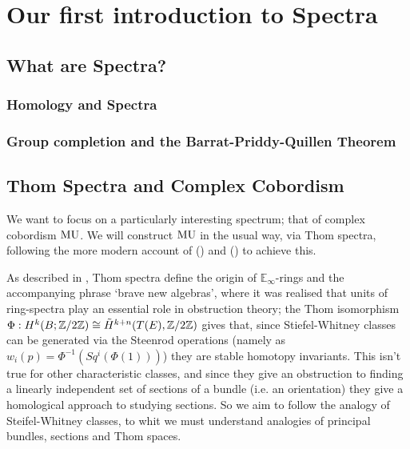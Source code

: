 \newpage
\section{Our first introduction to Spectra}

\subsection{What are Spectra?}
\subsubsection{Homology and Spectra}
\subsubsection{Group completion and the Barrat-Priddy-Quillen Theorem}



\newpage
\subsection{Thom Spectra and Complex Cobordism}
We want to focus on a particularly interesting spectrum; that of complex cobordism $\text{MU}$. We will construct $\text{MU}$ in the usual way, via Thom spectra, following the more modern account of (\cite{Ando2008}) and (\cite{Ando2013}) to achieve this.

As described in \cite{Ando2008}, Thom spectra define the origin of $\mathbb{E}_\infty$-rings and the accompanying phrase `brave new algebras', where it was realised that units of ring-spectra play an essential role in obstruction theory; the Thom isomorphism $\Phi : H^k(B; \mathbb{Z}/2\mathbb{Z}) \cong \tilde{H}^{k+n}(T(E),\mathbb{Z}/2\mathbb{Z})$ gives that, since Stiefel-Whitney classes can be generated via the Steenrod operations (namely as $w_i(p) = \Phi^{-1}(Sq^i(\Phi(1)))$) they are stable homotopy invariants. This isn't true for other characteristic classes, and since they give an obstruction to finding a linearly independent set of sections of a bundle (i.e. an orientation) they give a homological approach to studying sections. So we aim to follow the analogy of Steifel-Whitney classes, to whit we must understand analogies of principal bundles, sections and Thom spaces.


